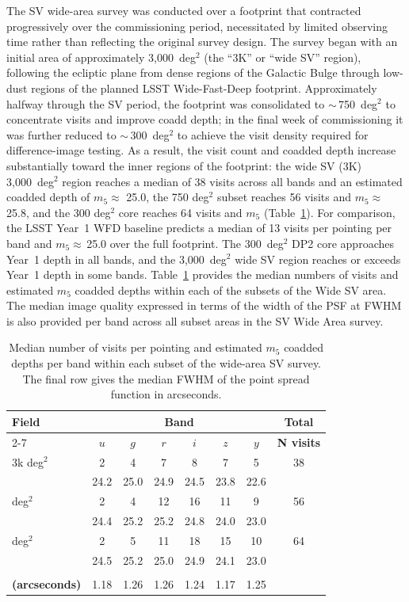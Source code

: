 The SV wide-area survey was conducted over a footprint that contracted progressively over the commissioning period, necessitated by limited observing time rather than reflecting the original survey design.
The survey began with an initial area of approximately 3,000~deg$^{2}$ (the ``3K'' or ``wide SV'' region), following the ecliptic plane from dense regions of the Galactic Bulge through low-dust regions of the planned LSST Wide-Fast-Deep footprint.
Approximately halfway through the SV period, the footprint was consolidated to $\sim$\,750~deg$^{2}$ to concentrate visits and improve coadd depth; in the final week of commissioning it was further reduced to $\sim$\,300~deg$^{2}$ to achieve the visit density required for difference-image testing.
As a result, the visit count and coadded depth increase substantially toward the inner regions of the footprint: the wide SV (3K) 3,000~deg$^{2}$ region reaches a median of 38 visits across all bands and an estimated coadded depth of $m_5\approx$ 25.0, the 750 deg$^{2}$ subset reaches 56 visits and $m_5\approx$ 25.8, and the 300 deg$^{2}$ core reaches 64 visits and $m_5$  (Table~\ref{tab:sv_wide_configs}).
For comparison, the LSST Year~1 WFD baseline predicts a median of 13 visits per pointing per band and $m_5 \approx$\,25.0 over the full footprint.
The 300~deg$^{2}$ DP2 core approaches Year~1 depth in all bands, and the 3,000~deg$^{2}$ wide SV region reaches or exceeds Year~1 depth in some bands.
Table~\ref{tab:sv_wide_configs} provides the median numbers of visits and estimated $m_5$ coadded depths  within each of the subsets of the Wide SV area.
The median image quality expressed in terms of the width of the PSF at FWHM is also provided per band across all subset areas in the SV Wide Area survey.
\begin{table}[htbp]
\centering
\renewcommand{\arraystretch}{1.2}
\begin{tabular}{lccccccc}
\toprule
\textbf{Field} &
\multicolumn{6}{c}{\textbf{Band}} &
\textbf{Total} \\
\cmidrule(lr){2-7}
 & $u$ & $g$ & $r$ & $i$ & $z$ & $y$ & \textbf{N visits} \\
\midrule
3k deg$^2$  & 2 & 4 & 7 & 8 & 7 & 5 & 38 \\
             & 24.2 & 25.0 & 24.9 & 24.5 & 23.8 & 22.6 &  \\
\addlinespace
750 deg$^2$ & 2 & 4 & 12 & 16 & 11 & 9 & 56 \\
             & 24.4 & 25.2 & 25.2 & 24.8 & 24.0 & 23.0 &  \\
\addlinespace
300 deg$^2$ & 2 & 5 & 11 & 18 & 15 & 10 & 64 \\
             & 24.5 & 25.2 & 25.0 & 24.9 & 24.1 & 23.0 &  \\
\midrule
\makecell[l]{\textbf{Median FWHM}\\\textbf{(arcseconds)}}
 & 1.18 & 1.26 & 1.26 & 1.24 & 1.17 & 1.25 &  \\
\bottomrule
\end{tabular}
\caption{Median number of visits per pointing and estimated $m_5$ coadded depths per band within each subset of the wide-area SV survey. The final row gives the median FWHM of the point spread function in arcseconds.}
\label{tab:sv_wide_configs}
\end{table}

